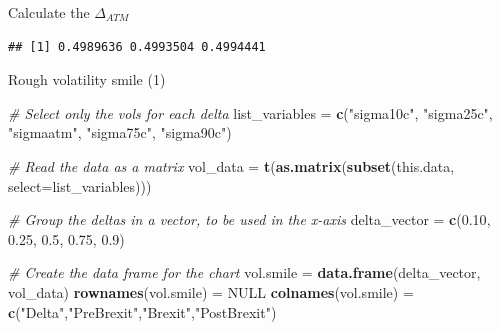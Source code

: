\documentclass[ignorenonframetext,aspectratio=169]{beamer}
\newenvironment{Shaded}{}{}
\newcommand{\KeywordTok}[1]{\textcolor[rgb]{0.00,0.44,0.13}{\textbf{#1}}}
\newcommand{\DataTypeTok}[1]{\textcolor[rgb]{0.56,0.13,0.00}{#1}}
\newcommand{\DecValTok}[1]{\textcolor[rgb]{0.25,0.63,0.44}{#1}}
\newcommand{\FloatTok}[1]{\textcolor[rgb]{0.25,0.63,0.44}{#1}}
\newcommand{\StringTok}[1]{\textcolor[rgb]{0.25,0.44,0.63}{#1}}
\newcommand{\CommentTok}[1]{\textcolor[rgb]{0.38,0.63,0.69}{\textit{#1}}}
\newcommand{\OtherTok}[1]{\textcolor[rgb]{0.00,0.44,0.13}{#1}}
\newcommand{\OperatorTok}[1]{\textcolor[rgb]{0.40,0.40,0.40}{#1}}
\newcommand{\NormalTok}[1]{#1}
\begin{document}
\begin{frame}[fragile]{Calculate the \(\Delta_{ATM}\)}

\begin{Shaded}
\end{Shaded}

\begin{verbatim}
## [1] 0.4989636 0.4993504 0.4994441
\end{verbatim}

\end{frame}

\begin{frame}[fragile]{Rough volatility smile (1)}

\begin{Shaded}
\begin{Highlighting}[]
\CommentTok{# Select only the vols for each delta}
\NormalTok{list_variables =}\StringTok{ }\KeywordTok{c}\NormalTok{(}\StringTok{"sigma10c"}\NormalTok{, }\StringTok{"sigma25c"}\NormalTok{, }\StringTok{"sigmaatm"}\NormalTok{, }
                   \StringTok{"sigma75c"}\NormalTok{, }\StringTok{"sigma90c"}\NormalTok{)}

\CommentTok{# Read the data as a matrix}
\NormalTok{vol_data =}\StringTok{ }\KeywordTok{t}\NormalTok{(}\KeywordTok{as.matrix}\NormalTok{(}\KeywordTok{subset}\NormalTok{(this.data, }\DataTypeTok{select=}\NormalTok{list_variables)))}

\CommentTok{# Group the deltas in a vector, to be used in the x-axis}
\NormalTok{delta_vector =}\StringTok{ }\KeywordTok{c}\NormalTok{(}\FloatTok{0.10}\NormalTok{, }\FloatTok{0.25}\NormalTok{, }\FloatTok{0.5}\NormalTok{, }\FloatTok{0.75}\NormalTok{, }\FloatTok{0.9}\NormalTok{)}

\CommentTok{# Create the data frame for the chart}
\NormalTok{vol.smile  =}\StringTok{ }\KeywordTok{data.frame}\NormalTok{(delta_vector, vol_data)   }
\KeywordTok{rownames}\NormalTok{(vol.smile) =}\StringTok{ }\OtherTok{NULL}
\KeywordTok{colnames}\NormalTok{(vol.smile) =}\StringTok{ }\KeywordTok{c}\NormalTok{(}\StringTok{"Delta"}\NormalTok{,}\StringTok{"PreBrexit"}\NormalTok{,}\StringTok{"Brexit"}\NormalTok{,}\StringTok{"PostBrexit"}\NormalTok{)}
\end{Highlighting}
\end{Shaded}

\end{frame}
\end{document}
